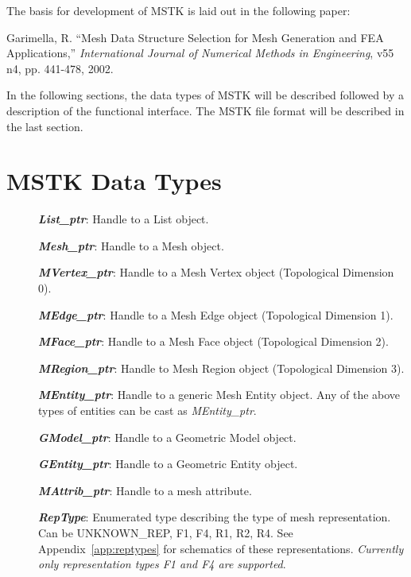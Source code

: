 \documentclass[12pt]{article}
\begin{document}
\par The basis for development of MSTK is laid out in the following paper:

Garimella, R. ``Mesh Data Structure Selection for Mesh Generation and
FEA Applications,'' \textit{International Journal of Numerical Methods
  in Engineering}, v55 n4, pp. 441-478, 2002.

In the following sections, the data types of MSTK will be described
followed by a description of the functional interface. The MSTK file
format will be described in the last section.

\newpage
\section{MSTK Data Types}

\begin{description}
\item[]\textbf{\textit{List\_ptr}}: Handle to a List object.

\item[]\textbf{\textit{Mesh\_ptr}}: Handle to a Mesh object.

\item[]\textbf{\textit{MVertex\_ptr}}: Handle to a Mesh Vertex object (Topological
Dimension 0).

\item[]\textbf{\textit{MEdge\_ptr}}: Handle to a Mesh Edge object (Topological Dimension 1).

\item[]\textbf{\textit{MFace\_ptr}}: Handle to a Mesh Face object (Topological Dimension 2).

\item[]\textbf{\textit{MRegion\_ptr}}: Handle to Mesh Region object (Topological Dimension 3).
  
\item[]\textbf{\textit{MEntity\_ptr}}: Handle to a generic Mesh Entity
  object. Any of the above types of entities can be cast as
  \textit{MEntity\_ptr}.

\item[]\textbf{\textit{GModel\_ptr}}: Handle to a Geometric Model object.
\item[]\textbf{\textit{GEntity\_ptr}}: Handle to a Geometric Entity object.

\item[]\textbf{\textit{MAttrib\_ptr}}: Handle to a mesh attribute.
  
\item[]\textbf{\textit{RepType}}: Enumerated type describing the type
  of mesh representation.  Can be UNKNOWN\_REP, F1, F4, R1, R2, R4.
  See Appendix~\ref{app:reptypes} for schematics of these
  representations. \textit{Currently only representation types F1 and
    F4 are supported}.


\end{description}
\end{document}
